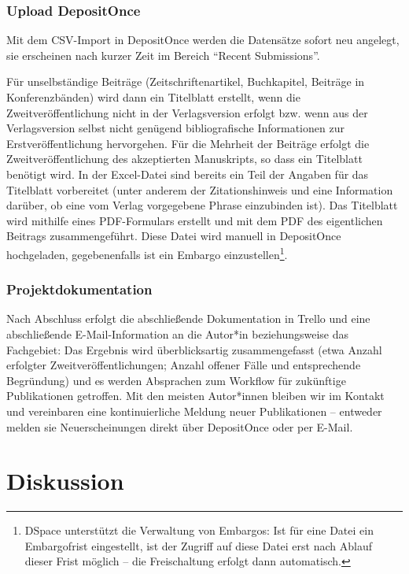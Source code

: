 \documentclass[a4paper,
fontsize=11pt,
oneside,
numbers=noperiodatend,
parskip=half-,
bibliography=totoc,
final
]{scrartcl}
\begin{document}
\hypertarget{upload-depositonce}{%
\subsubsection{Upload DepositOnce}\label{upload-depositonce}}

Mit dem CSV-Import in DepositOnce werden die Datensätze sofort neu
angelegt, sie erscheinen nach kurzer Zeit im Bereich \enquote{Recent
Submissions}.

Für unselbständige Beiträge (Zeitschriftenartikel, Buchkapitel, Beiträge
in Konferenzbänden) wird dann ein Titelblatt erstellt, wenn die
Zweitveröffentlichung nicht in der Verlagsversion erfolgt bzw. wenn aus
der Verlagsversion selbst nicht genügend bibliografische Informationen
zur Erstveröffentlichung hervorgehen. Für die Mehrheit der Beiträge
erfolgt die Zweitveröffentlichung des akzeptierten Manuskripts, so dass
ein Titelblatt benötigt wird. In der Excel-Datei sind bereits ein Teil
der Angaben für das Titelblatt vorbereitet (unter anderem der
Zitationshinweis und eine Information darüber, ob eine vom Verlag
vorgegebene Phrase einzubinden ist). Das Titelblatt wird mithilfe eines
PDF-Formulars erstellt und mit dem PDF des eigentlichen Beitrags
zusammengeführt. Diese Datei wird manuell in DepositOnce hochgeladen,
gegebenenfalls ist ein Embargo einzustellen\footnote{DSpace unterstützt
  die Verwaltung von Embargos: Ist für eine Datei ein Embargofrist
  eingestellt, ist der Zugriff auf diese Datei erst nach Ablauf dieser
  Frist möglich -- die Freischaltung erfolgt dann automatisch.}.

\hypertarget{projektdokumentation}{%
\subsubsection{Projektdokumentation}\label{projektdokumentation}}

Nach Abschluss erfolgt die abschließende Dokumentation in Trello und
eine abschließende E-Mail-Information an die Autor*in beziehungsweise
das Fachgebiet: Das Ergebnis wird überblicksartig zusammengefasst (etwa
Anzahl erfolgter Zweitveröffentlichungen; Anzahl offener Fälle und
entsprechende Begründung) und es werden Absprachen zum Workflow für
zukünftige Publikationen getroffen. Mit den meisten Autor*innen bleiben
wir im Kontakt und vereinbaren eine kontinuierliche Meldung neuer
Publikationen -- entweder melden sie Neuerscheinungen direkt über
DepositOnce oder per E-Mail.

\hypertarget{diskussion}{%
\section{Diskussion}\label{diskussion}}
\end{document}
